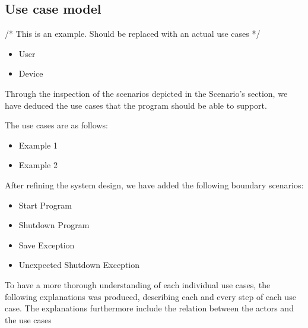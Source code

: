 \subsection{Use case model}


/* This is an example. Should be replaced with an actual use cases */
\begin{itemize}
	\setlength{\itemsep}{-5pt}
	\item User
	\item Device
\end{itemize}

Through the inspection of the scenarios depicted in the Scenario’s section, we have deduced the use cases that the program should be able to support.

The use cases are as follows:

\begin{itemize}
	\setlength{\itemsep}{-5pt}
	
	\item Example 1
	\item Example 2
\end{itemize}

After refining the system design, we have added the following boundary scenarios:
\begin{itemize}
	\setlength{\itemsep}{-5pt}
	
	\item Start Program
	\item Shutdown Program
	\item Save Exception
	\item Unexpected Shutdown Exception
\end{itemize}

To have a more thorough understanding of each individual use cases, the following explanations was produced, describing each and every step of each use case.
The explanations furthermore include the relation between the actors and the use cases

